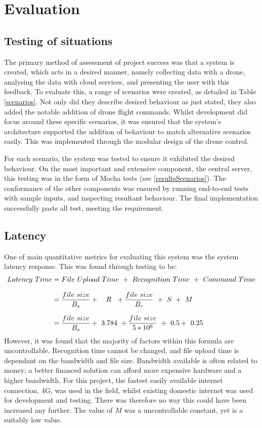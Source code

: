 \documentclass{article}
\begin{document}
\section{Evaluation}

\subsection{Testing of situations}
The primary method of assessment of project success was that a system is created, which acts in a desired manner, namely collecting data with a drone, analysing the data with cloud services, and presenting the user with this feedback. To evaluate this, a range of scenarios were created, as detailed in Table \ref{scenarios}. Not only did they describe desired behaviour as just stated, they also added the notable addition of drone flight commands. Whilst development did focus around these specific scenarios, it was ensured that the system's architecture supported the addition of behaviour to match alternative scenarios easily. This was implemented through the modular design of the drone control.

For each scenario, the system was tested to ensure it exhibited the desired behaviour. On the most important and extensive component, the central server, this testing was in the form of Mocha tests (see \ref{resultsScenarios}). The conformance of the other components was ensured by running end-to-end tests with sample inputs, and inspecting resultant behaviour. The final implementation successfully pasts all test, meeting the requirement. 

\subsection{Latency}
One of main quantitative metrics for evaluating this system was the system latency response. This was found through testing to be:
\begin{equation*}
\setlength{\jot}{10pt}
\begin{split}
Latency\ Time 	&= File\ Upload\ Time\ +\ Recognition\ Time\ +\ Command\ Time \\
				&= \frac{file\ size}{B_s} +\ \ \ R\ \ + \frac{file\ size}{B_r}\ +\ S\  +\ M \\
				&= \frac{file\ size}{B_s} +\ 3.784\ + \frac{file\ size}{5*10^6}\ +\ 0.5 +\ 0.25 
\end{split}
\end{equation*}
However, it was found that the majority of factors within this formula are uncontrollable. Recognition time cannot be changed, and file upload time is dependant on the bandwidth and file size. Bandwidth available is often related to money; a better financed solution can afford more expensive hardware and a higher bandwidth. For this project, the fastest easily available internet connection, 4G, was used in the field, whilst existing domestic internet was used for development and testing. There was therefore no way this could have been increased any further. The value of $M$ was a uncontrollable constant, yet is a suitably low value. 
\end{document}
